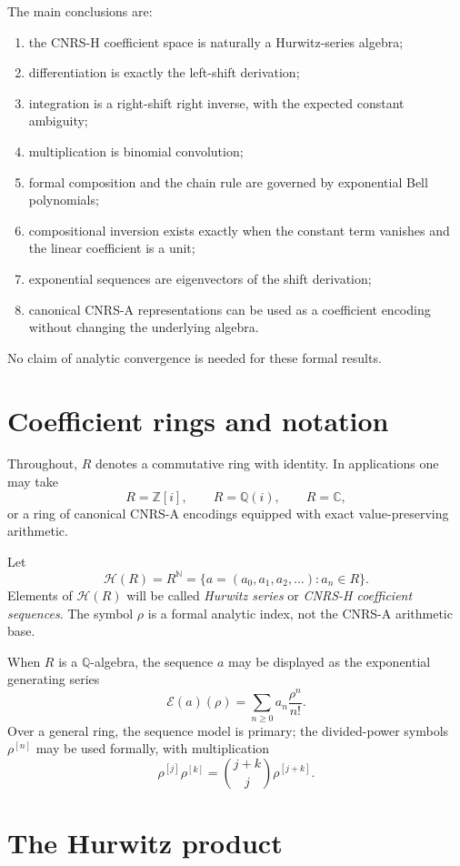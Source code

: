 \documentclass[11pt]{article}
\newcommand{\Hurs}{\mathcal H}
\newcommand{\N}{\mathbb N}
\newcommand{\Q}{\mathbb Q}
\newcommand{\C}{\mathbb C}
\newcommand{\GI}{\mathbb Z[i]}
\newcommand{\GQ}{\mathbb Q(i)}
\begin{document}
The main conclusions are:
\begin{enumerate}[label=(\roman*)]
\item the CNRS-H coefficient space is naturally a Hurwitz-series algebra;
\item differentiation is exactly the left-shift derivation;
\item integration is a right-shift right inverse, with the expected constant ambiguity;
\item multiplication is binomial convolution;
\item formal composition and the chain rule are governed by exponential Bell polynomials;
\item compositional inversion exists exactly when the constant term vanishes and the linear coefficient is a unit;
\item exponential sequences are eigenvectors of the shift derivation;
\item canonical CNRS-A representations can be used as a coefficient encoding without changing the underlying algebra.
\end{enumerate}

No claim of analytic convergence is needed for these formal results.

\section{Coefficient rings and notation}

Throughout, $R$ denotes a commutative ring with identity.  In applications one may take
\[
R=\GI,\qquad R=\GQ,\qquad R=\C,
\]
or a ring of canonical CNRS-A encodings equipped with exact value-preserving arithmetic.

Let
\[
\Hurs(R)=R^{\N}=\{a=(a_0,a_1,a_2,\ldots): a_n\in R\}.
\]
Elements of $\Hurs(R)$ will be called \emph{Hurwitz series} or \emph{CNRS-H coefficient sequences}.  The symbol $\rho$ is a formal analytic index, not the CNRS-A arithmetic base.

When $R$ is a $\Q$-algebra, the sequence $a$ may be displayed as the exponential generating series
\[
\mathcal E(a)(\rho)=\sum_{n\ge0}a_n\frac{\rho^n}{n!}.
\]
Over a general ring, the sequence model is primary; the divided-power symbols $\rho^{[n]}$ may be used formally, with multiplication
\[
\rho^{[j]}\rho^{[k]}=\binom{j+k}{j}\rho^{[j+k]}.
\]

\section{The Hurwitz product}
\end{document}
